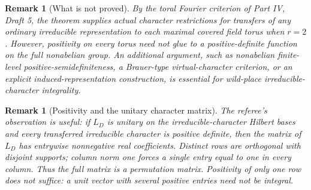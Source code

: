 \documentclass[11pt]{article}
\newtheorem{remark}[theorem]{Remark}
\newcommand{\1}{\mathbf 1}
\begin{document}
\begin{remark}[What is not proved]
By the toral Fourier criterion of Part IV, Draft 5, the theorem supplies actual character restrictions for transfers of any ordinary irreducible representation to each maximal covered field torus when $r=2$. However, positivity on every torus need not glue to a positive-definite function on the full nonabelian group. An additional argument, such as nonabelian finite-level positive-semidefiniteness, a Brauer-type virtual-character criterion, or an explicit induced-representation construction, is essential for wild-place irreducible-character integrality.
\end{remark}

\begin{remark}[Positivity and the unitary character matrix]
The referee's observation is useful: if $L_D$ is unitary on the irreducible-character Hilbert bases and \emph{every} transferred irreducible character is positive definite, then the matrix of $L_D$ has entrywise nonnegative real coefficients. Distinct rows are orthogonal with disjoint supports; column norm one forces a single entry equal to one in every column. Thus the full matrix is a permutation matrix. Positivity of only one row does not suffice: a unit vector with several positive entries need not be integral.
\end{remark}
\end{document}
